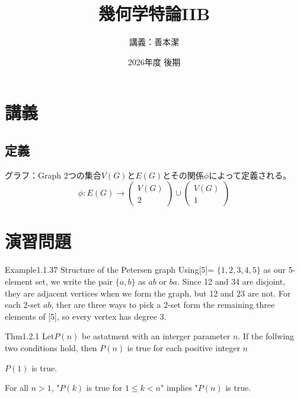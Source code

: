 \documentclass[dvipdfmx, leqno]{jsreport}
\title{幾何学特論IIB}
\author{講義：善本潔}
\date{2026年度 後期}
\begin{document}
\maketitle
\tableofcontents

\chapter{講義}
\section{定義}
\begin{soudef}{グラフ：Graph}
    2つの集合$V(G)$と$E(G)$とその関係$\phi$によって定義される。
\begin{equation*}
    \phi\colon E(G)\to \begin{pmatrix}V(G)\\ 2\end{pmatrix}\cup \begin{pmatrix}V(G)\\ 1\end{pmatrix}
\end{equation*}
\end{soudef}

\chapter{演習問題}
\begin{soupractice}{Example1.1.37}
    Structure of the Petersen graph Using[5]= $\{1, 2, 3, 4, 5\}$ as our 5-element set, we write the pair $\{a, b\}$ as $ab$ or $ba$. Since 12 and 34 are disjoint, they are adjacent vertices when we form the graph, but 12 and 23 are not. For each 2-set $ab$, ther are three ways to pick a 2-set form the remaining three elements of [5], so every vertex has degree 3.\\

\end{soupractice}

\begin{soupractice}{Thm1.2.1}
    Let$P(n)$ be astatment with an interger parameter $n$. If the follwing two conditions hold, then $P(n)$ is true for each positive integer $n$
\begin{enumerate_roman}
    \item $P(1)$ is true.\label{Thm1.2.1_stat_1}
    \item For all $n> 1$, "$P(k)$ is true for $1\le k< n$" implies "$P(n)$ is true.\label{Thm1.2.1_stat_2}
\end{enumerate_roman}
\end{soupractice}
\end{document}
